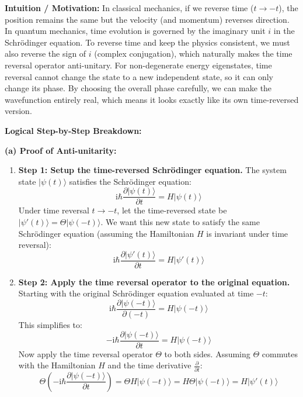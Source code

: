 \begin{solution}
\textbf{Intuition / Motivation:}
In classical mechanics, if we reverse time ($t \to -t$), the position remains the same but the velocity (and momentum) reverses direction. In quantum mechanics, time evolution is governed by the imaginary unit $i$ in the Schrödinger equation. To reverse time and keep the physics consistent, we must also reverse the sign of $i$ (complex conjugation), which naturally makes the time reversal operator anti-unitary. For non-degenerate energy eigenstates, time reversal cannot change the state to a new independent state, so it can only change its phase. By choosing the overall phase carefully, we can make the wavefunction entirely real, which means it looks exactly like its own time-reversed version.

\textbf{Logical Step-by-Step Breakdown:}

\textbf{(a) Proof of Anti-unitarity:}
\begin{enumerate}
    \item \textbf{Step 1: Setup the time-reversed Schrödinger equation.}
    The system state $|\psi(t)\rangle$ satisfies the Schrödinger equation:
    \[ \mathrm{i}\hbar \frac{\partial |\psi(t)\rangle}{\partial t} = H |\psi(t)\rangle \]
    Under time reversal $t \to -t$, let the time-reversed state be $|\psi'(t)\rangle = \Theta |\psi(-t)\rangle$. We want this new state to satisfy the same Schrödinger equation (assuming the Hamiltonian $H$ is invariant under time reversal):
    \[ \mathrm{i}\hbar \frac{\partial |\psi'(t)\rangle}{\partial t} = H |\psi'(t)\rangle \]
    
    \item \textbf{Step 2: Apply the time reversal operator to the original equation.}
    Starting with the original Schrödinger equation evaluated at time $-t$:
    \[ \mathrm{i}\hbar \frac{\partial |\psi(-t)\rangle}{\partial (-t)} = H |\psi(-t)\rangle \]
    This simplifies to:
    \[ -\mathrm{i}\hbar \frac{\partial |\psi(-t)\rangle}{\partial t} = H |\psi(-t)\rangle \]
    Now apply the time reversal operator $\Theta$ to both sides. Assuming $\Theta$ commutes with the Hamiltonian $H$ and the time derivative $\frac{\partial}{\partial t}$:
    \[ \Theta \left( -\mathrm{i}\hbar \frac{\partial |\psi(-t)\rangle}{\partial t} \right) = \Theta H |\psi(-t)\rangle = H \Theta |\psi(-t)\rangle = H |\psi'(t)\rangle \]
    

\end{enumerate}
\end{solution}
